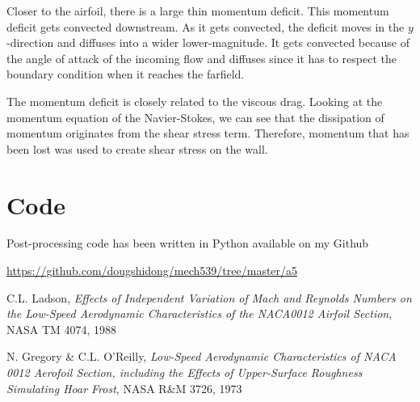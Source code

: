 \documentclass[letterpaper,12pt,]{article}
\begin{document}
Closer to the airfoil, there is a large thin momentum deficit.
This momentum deficit gets convected downstream.
As it gets convected, the deficit moves in the $y$-direction and diffuses into a wider lower-magnitude.
It gets convected because of the angle of attack of the incoming flow and diffuses since it has to respect the boundary condition when it reaches the farfield.

The momentum deficit is closely related to the viscous drag.
Looking at the momentum equation of the Navier-Stokes, we can see that the dissipation of momentum originates from the shear stress term.
Therefore, momentum that has been lost was used to create shear stress on the wall.

\section*{Code}

Post-processing code has been written in Python available on my Github

\url{https://github.com/dougshidong/mech539/tree/master/a5}

\begin{thebibliography}{1}

 C.L. Ladson, {\em Effects of Independent Variation of Mach and Reynolds Numbers on the Low-Speed Aerodynamic Characteristics of the NACA0012 Airfoil Section}, NASA TM 4074, 1988

 N. Gregory \& C.L. O'Reilly, {\em Low-Speed Aerodynamic Characteristics of NACA 0012 Aerofoil Section, including the Effects of Upper-Surface Roughness Simulating Hoar Frost}, NASA R\&M 3726, 1973

\end{thebibliography}
\end{document}
